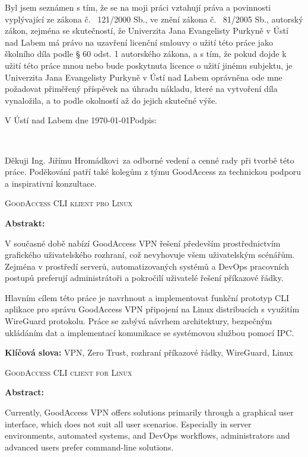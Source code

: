 \documentclass[male,czech,api_bc]{kitheses}
\newcommand{\nazevcz}{GoodAccess CLI klient pro Linux}        %
\newcommand{\nazeven}{GoodAccess CLI client for Linux}     %
\newcommand{\vedouciDAT}{Ing. Jiřímu Hromádkovi}
\begin{document}
Byl jsem seznámen 
s tím, že se na moji práci vztahují práva a povinnosti vyplývající ze
zákona č. ~121/2000 Sb., ve znění zákona č. ~81/2005 Sb., autorský zákon, zejména se
skutečností, že Univerzita Jana Evangelisty Purkyně v Ústí nad Labem má právo na uzavření
licenční smlouvy o užití této práce jako školního díla podle § 60 odst. 1 autorského zákona, a
s tím, že pokud dojde k užití této práce mnou nebo bude poskytnuta licence o užití jinému
subjektu, je Univerzita Jana Evangelisty Purkyně v Ústí nad Labem oprávněna ode mne
požadovat přiměřený příspěvek na úhradu nákladu, které na vytvoření díla vynaložila, a to
podle okolností až do jejich skutečné výše.

\vspace{2em}

V Ústí nad Labem dne \today   \hfill Podpis: \makebox[4cm][s]{\dotfill}

\cleardoublepage
\thispagestyle{empty}
~
\vfill

\begin{flushright}
    Děkuji \vedouciDAT\ za odborné vedení a cenné rady při tvorbě této práce.
    Poděkování patří také kolegům z týmu GoodAccess za technickou podporu
    a inspirativní konzultace.
\end{flushright}

\cleardoublepage

\textsc{\nazevcz}

\textbf{Abstrakt:}

V současné době nabízí GoodAccess VPN řešení především prostřednictvím grafického uživatelského rozhraní, což nevyhovuje všem uživatelským scénářům. Zejména v prostředí serverů, automatizovaných systémů a DevOps pracovních postupů preferují administrátoři a pokročilí uživatelé řešení příkazové řádky.

Hlavním cílem této práce je navrhnout a implementovat funkční prototyp CLI aplikace pro správu GoodAccess VPN připojení na Linux distribucích s využitím WireGuard protokolu. Práce se zabývá návrhem architektury, bezpečným ukládáním dat a implementací komunikace se systémovou službou pomocí IPC.

\textbf{Klíčová slova:} VPN, Zero Trust, rozhraní příkazové řádky, WireGuard, Linux

\bigskip


\textsc{\nazeven}

\textbf{Abstract:}

Currently, GoodAccess VPN offers solutions primarily through a graphical user interface, which does not suit all user scenarios. Especially in server environments, automated systems, and DevOps workflows, administrators and advanced users prefer command-line solutions.
\end{document}
